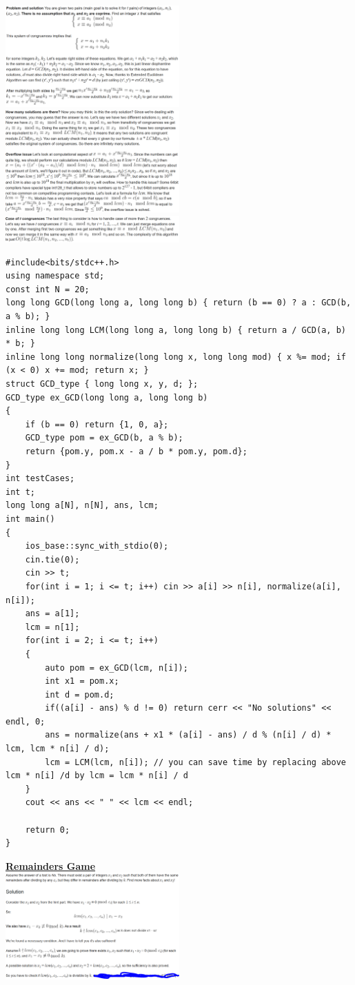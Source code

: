 \documentclass[8pt, a4paper, oneside, twocolumn]{extarticle}
\begin{document}
\includegraphics[width=0.5\textwidth,height=0.5\textheight,keepaspectratio]{assets/crt}
\includegraphics[width=0.5\textwidth,height=0.5\textheight,keepaspectratio]{assets/crt2}
\includegraphics[width=0.5\textwidth,height=0.5\textheight,keepaspectratio]{assets/crt3}
\begin{verbatim}
#include<bits/stdc++.h>
using namespace std;
const int N = 20;
long long GCD(long long a, long long b) { return (b == 0) ? a : GCD(b, a % b); }
inline long long LCM(long long a, long long b) { return a / GCD(a, b) * b; }
inline long long normalize(long long x, long long mod) { x %= mod; if (x < 0) x += mod; return x; }
struct GCD_type { long long x, y, d; };
GCD_type ex_GCD(long long a, long long b)
{
    if (b == 0) return {1, 0, a};
    GCD_type pom = ex_GCD(b, a % b);
    return {pom.y, pom.x - a / b * pom.y, pom.d};
}
int testCases;
int t;
long long a[N], n[N], ans, lcm;
int main()
{
    ios_base::sync_with_stdio(0);
    cin.tie(0);
    cin >> t;
    for(int i = 1; i <= t; i++) cin >> a[i] >> n[i], normalize(a[i], n[i]);
    ans = a[1];
    lcm = n[1];
    for(int i = 2; i <= t; i++)
    {
        auto pom = ex_GCD(lcm, n[i]);
        int x1 = pom.x;
        int d = pom.d;
        if((a[i] - ans) % d != 0) return cerr << "No solutions" << endl, 0;
        ans = normalize(ans + x1 * (a[i] - ans) / d % (n[i] / d) * lcm, lcm * n[i] / d);
        lcm = LCM(lcm, n[i]); // you can save time by replacing above lcm * n[i] /d by lcm = lcm * n[i] / d
    }
    cout << ans << " " << lcm << endl;
 
    return 0;
}
\end{verbatim}
\href{https://codeforces.com/problemset/problem/687/B}{\textbf{Remainders Game}}\\
\includegraphics[width=0.5\textwidth,height=0.5\textheight,keepaspectratio]{assets/rem}
\end{document}
